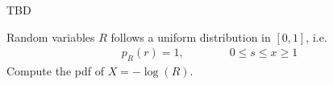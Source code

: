 \ifspanish

TBD

\else

Random variables $R$ follows a uniform distribution in $[0, 1]$, i.e.
\begin{align}
p_{R}(r) = 1,    \qquad \qquad 0 \le s \le x \ge 1
\end{align}
Compute the pdf of $X=-\log(R)$.

\begin{solution}
\end{solution}





\fi